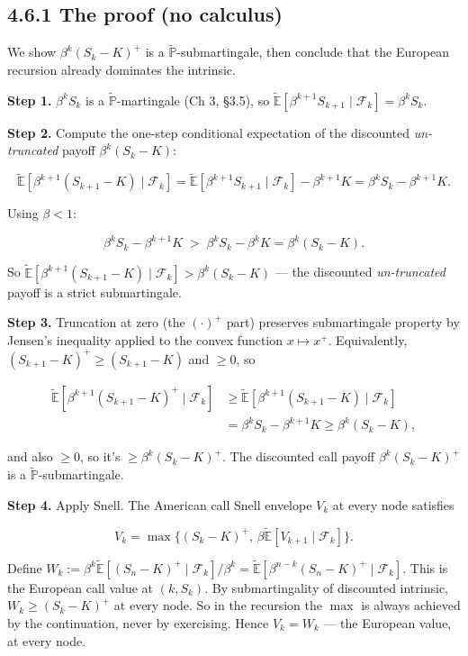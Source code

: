 \documentclass[
  10pt,
  twoside]{book}
\begin{document}
\subsection{4.6.1 The proof (no calculus)}\label{the-proof-no-calculus}

We show \(\beta^k (S_k - K)^+\) is a
\(\tilde{\mathbb{P}}\)-submartingale, then conclude that the European
recursion already dominates the intrinsic.

\textbf{Step 1.} \(\beta^k S_k\) is a \(\tilde{\mathbb{P}}\)-martingale
(Ch 3, §3.5), so
\(\tilde{\mathbb{E}}[\beta^{k+1}S_{k+1}\mid\mathcal F_k] = \beta^k S_k\).

\textbf{Step 2.} Compute the one-step conditional expectation of the
discounted \emph{un-truncated} payoff \(\beta^k(S_k - K)\):

\[\tilde{\mathbb{E}}\!\left[\beta^{k+1}(S_{k+1} - K)\mid\mathcal F_k\right] = \tilde{\mathbb{E}}\!\left[\beta^{k+1} S_{k+1}\mid\mathcal F_k\right] - \beta^{k+1} K = \beta^k S_k - \beta^{k+1} K.\]

Using \(\beta < 1\):

\[\beta^k S_k - \beta^{k+1} K \;>\; \beta^k S_k - \beta^k K = \beta^k(S_k - K).\]

So
\(\tilde{\mathbb{E}}[\beta^{k+1}(S_{k+1} - K)\mid\mathcal F_k] > \beta^k(S_k - K)\)
--- the discounted \emph{un-truncated} payoff is a strict submartingale.

\textbf{Step 3.} Truncation at zero (the \((\cdot)^+\) part) preserves
submartingale property by Jensen's inequality applied to the convex
function \(x \mapsto x^+\). Equivalently,
\((S_{k+1} - K)^+ \ge (S_{k+1} - K)\) and \(\ge 0\), so

\[\begin{aligned}
\tilde{\mathbb{E}}\!\left[\beta^{k+1}(S_{k+1} - K)^+\mid\mathcal F_k\right] &\ge \tilde{\mathbb{E}}\!\left[\beta^{k+1}(S_{k+1} - K)\mid\mathcal F_k\right] \\
&= \beta^k S_k - \beta^{k+1} K \ge \beta^k(S_k - K),
\end{aligned}\]

and also \(\ge 0\), so it's \(\ge \beta^k(S_k - K)^+\). The discounted
call payoff \(\beta^k(S_k - K)^+\) is a
\(\tilde{\mathbb{P}}\)-submartingale.

\textbf{Step 4.} Apply Snell. The American call Snell envelope \(V_k\)
at every node satisfies

\[V_k = \max\{(S_k - K)^+,\, \beta\tilde{\mathbb{E}}[V_{k+1}\mid\mathcal F_k]\}.\]

Define
\(W_k := \beta^k\tilde{\mathbb{E}}[(S_n - K)^+\mid\mathcal F_k]/\beta^k = \tilde{\mathbb{E}}[\beta^{n-k}(S_n - K)^+\mid\mathcal F_k]\).
This is the European call value at \((k, S_k)\). By submartingality of
discounted intrinsic, \(W_k \ge (S_k - K)^+\) at every node. So in the
recursion the \(\max\) is always achieved by the continuation, never by
exercising. Hence \(V_k = W_k\) --- the European value, at every node.
\end{document}
